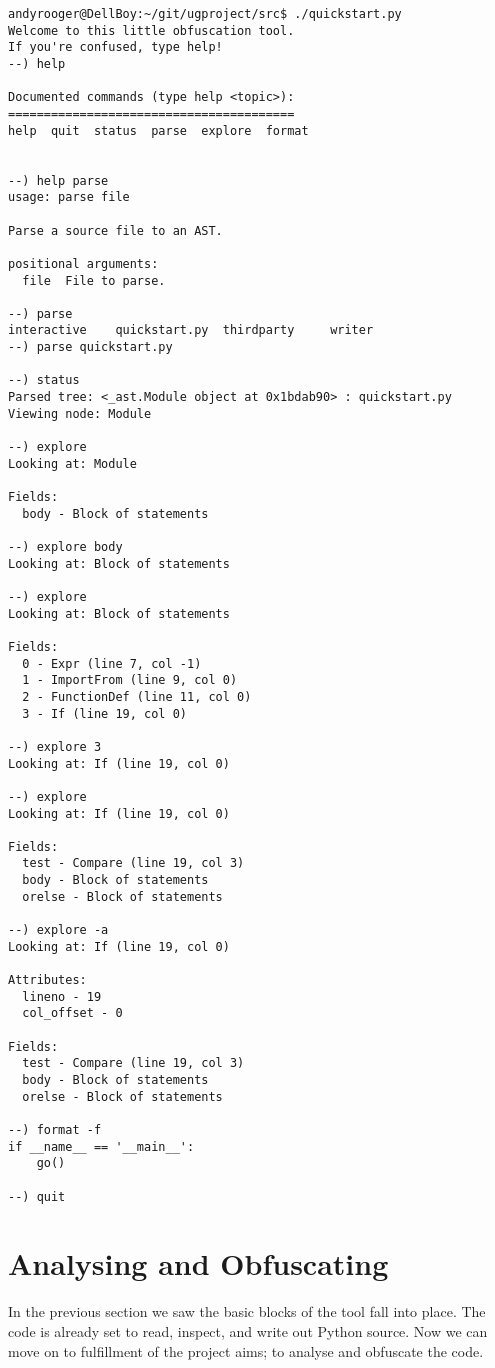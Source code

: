 \documentclass{report}
\begin{document}
\begin{lstlisting}[language=obftool,basicstyle=\small]
andyrooger@DellBoy:~/git/ugproject/src$ ./quickstart.py 
Welcome to this little obfuscation tool.
If you're confused, type help!
--) help

Documented commands (type help <topic>):
========================================
help  quit  status  parse  explore  format


--) help parse
usage: parse file

Parse a source file to an AST.

positional arguments:
  file  File to parse.

--) parse 
interactive    quickstart.py  thirdparty     writer         
--) parse quickstart.py

--) status
Parsed tree: <_ast.Module object at 0x1bdab90> : quickstart.py
Viewing node: Module

--) explore
Looking at: Module

Fields:
  body - Block of statements

--) explore body
Looking at: Block of statements

--) explore
Looking at: Block of statements

Fields:
  0 - Expr (line 7, col -1)
  1 - ImportFrom (line 9, col 0)
  2 - FunctionDef (line 11, col 0)
  3 - If (line 19, col 0)

--) explore 3
Looking at: If (line 19, col 0)

--) explore
Looking at: If (line 19, col 0)

Fields:
  test - Compare (line 19, col 3)
  body - Block of statements
  orelse - Block of statements

--) explore -a
Looking at: If (line 19, col 0)

Attributes:
  lineno - 19
  col_offset - 0

Fields:
  test - Compare (line 19, col 3)
  body - Block of statements
  orelse - Block of statements

--) format -f
if __name__ == '__main__':
    go()

--) quit
\end{lstlisting}

\section{Analysing and Obfuscating}

In the previous section we saw the basic blocks of the tool fall into place. The code
is already set to read, inspect, and write out Python source. Now we can move
on to fulfillment of the project aims; to analyse and obfuscate the code.
\end{document}
